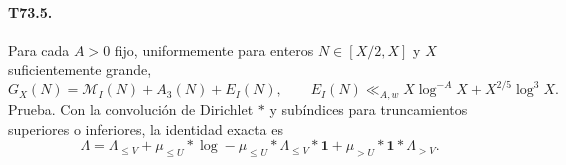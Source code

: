 \documentclass[11pt,a4paper]{article}
\newcommand{\B}[2]{#2}
\newcommand{\B}[2]{#1}
\newcommand{\one}{\mathbf 1}
\begin{document}
\paragraph{T73.5.}
\B{For every fixed $A>0$, uniformly in integers $N\in[X/2,X]$ for sufficiently large $X$,}{Para cada $A>0$ fijo, uniformemente para enteros $N\in[X/2,X]$ y $X$ suficientemente grande,}
\begin{equation}\label{eq:TI}
 G_X(N)=\mathcal M_I(N)+A_3(N)+E_I(N),\qquad
 E_I(N)\ll_{A,w}X\log^{-A}X+X^{2/5}\log^3 X.
\end{equation}
\B{Proof. With Dirichlet convolution $*$ and subscripts denoting upper or lower truncations, the exact identity is}{Prueba. Con la convolución de Dirichlet $*$ y subíndices para truncamientos superiores o inferiores, la identidad exacta es}
\[
 \Lambda=\Lambda_{\le V}+\mu_{\le U}*\log
         -\mu_{\le U}*\Lambda_{\le V}*\one+\mu_{>U}*\one*\Lambda_{>V}.
\]
\end{document}
